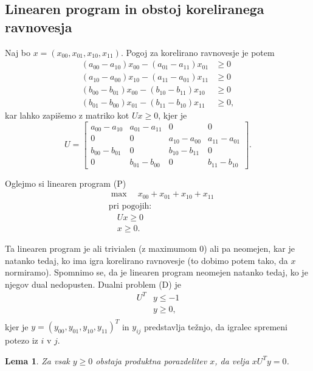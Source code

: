 \documentclass{article}
\newtheorem{lemma}{Lema}
\begin{document}
\subsection[]{Linearen program in obstoj koreliranega ravnovesja}
Naj bo $x = (x_{00}, x_{01}, x_{10}, x_{11})$. Pogoj za korelirano ravnovesje je potem
\begin{align*}
    (a_{00} - a_{10})x_{00} - (a_{01} - a_{11}) x_{01} &\geq 0 \\
    (a_{10} - a_{00})x_{10} - (a_{11} - a_{01}) x_{11}&\geq 0 \\
    (b_{00} - b_{01})x_{00} - (b_{10} - b_{11}) x_{10}&\geq 0 \\
    (b_{01} - b_{00})x_{01} - (b_{11} - b_{10}) x_{11}&\geq 0, 
\end{align*}
kar lahko zapišemo z matriko kot $U x \geq 0$, kjer je
$$ U = \begin{bmatrix}
    a_{00} - a_{10} & a_{01} - a_{11} & 0 & 0\\
    0 & 0 & a_{10} - a_{00} & a_{11} - a_{01} \\
    b_{00} - b_{01} & 0 & b_{10} - b_{11} & 0 \\
    0 & b_{01} - b_{00} & 0 & b_{11} - b_{10}
    \end{bmatrix}. $$

Oglejmo si linearen program (P)
\begin{align*}
    &\max \quad x_{00} + x_{01} + x_{10} + x_{11} \\
    &\text{pri pogojih:} \\
    &\quad U x \geq 0 \\
    &\quad x \geq 0.
\end{align*}

Ta linearen program je ali trivialen (z maximumom 0) ali pa neomejen, kar je natanko tedaj, ko ima igra korelirano ravnovesje (to dobimo potem tako, da $x$ normiramo). Spomnimo se, da je linearen program neomejen natanko tedaj, ko je njegov dual nedopusten. Dualni problem (D) je
\begin{align*}
    U^T &y \leq -1 \\
    & y \geq 0, \\
\end{align*}
kjer je $y = (y_00, y_01, y_10, y_11)^T$ in $y_{ij}$ predstavlja težnjo, da igralec spremeni potezo iz $i$ v $j$.

\begin{lemma}
    Za vsak $y \geq 0$ obstaja produktna porazdelitev $x$, da velja $x U^T y = 0$.
\end{lemma}
\end{document}
